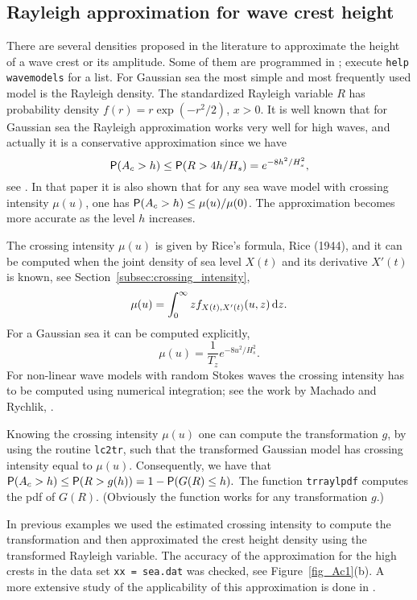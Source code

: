 \subsection{Rayleigh approximation for wave crest height}\label{ss:Rayleighappr}
\label{ss:Rayleighapproximation}
There are several densities proposed in the literature to approximate
the height of a wave crest or its amplitude. Some of them are programmed
in \progname{}; execute {\tt help wavemodels} for a list.
For Gaussian sea the most simple and most
frequently used model is the Rayleigh
density. The standardized Rayleigh variable $R$ has probability density 
$f(r)=r\exp(-r^2/2)$, $x > 0$. It is well known that for Gaussian sea
the Rayleigh approximation works very well for high waves,
and actually it is a conservative approximation since we have
$$
\mbox{\sf P} (A_c > h) \leq \mbox{\sf P} (R> 4 h/H_s) = e^{-8h^2/H_s^2},
$$
see \cite{RyclikAndLeadbettter1997Analysis}.
In that paper it is also shown that for any sea wave model with
crossing intensity $\mu(u)$, one has $\mbox{\sf P} (A_c>h) \leq \mu(u)/\mu(0)$.
The approximation becomes more accurate as the level $h$
increases.

The crossing intensity $\mu(u)$ is given by
Rice's formula, Rice (1944),
and it can be computed when the joint density of sea level $X(t)$ and its
derivative $X'(t)$ is known, see Section~\ref{subsec:crossing_intensity},
$$
\mu(u) = \int_0^{\infty} zf_{X(t), X'(t)}(u,z)\,\mathrm{d} z.
$$
For a Gaussian sea it can be computed explicitly,
$$
\mu(u) = \frac{1}{T_z} e^{-8u^2/H_s^2}.
$$
For non-linear wave models with random Stokes waves the crossing
intensity has to be computed using numerical integration; see the
work  by Machado and Rychlik,
\cite{MachadoAndRychlik2003Wave}.

Knowing the crossing intensity $\mu(u)$ one can compute the
transformation $g$, by using the routine
{\tt lc2tr}, such that  the transformed
Gaussian model has crossing intensity equal to $\mu(u)$. Consequently,
we have that 
$
\mbox{\sf P} (A_c>h) \leq \mbox{\sf P} (R> g(h)) = 1- \mbox{\sf P} (G(R)\leq h).$
The function {\tt trraylpdf} computes the pdf of $G(R)$. (Obviously
the function works for any transformation $g$.)

In previous examples we used the estimated crossing intensity to
compute the transformation and then approximated the crest height
density using the transformed Rayleigh variable.
The accuracy of the approximation for the high crests in
the data set {\tt xx = sea.dat} was checked, see Figure~\ref{fig_Ac1}(b).
A more extensive study of the applicability of this approximation
is done in \cite{RyclikAndLeadbettter1997Analysis}.



